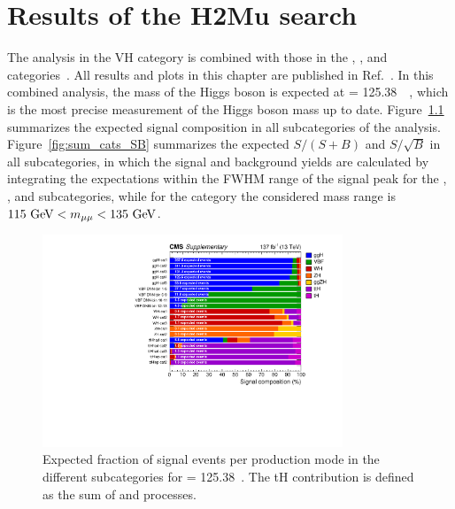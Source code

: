 \chapter{Results of the H2Mu search} \label{chp:hmm_results}

The analysis in the VH category is combined with those in the \ggH, \qqH, and \ttH categories~\cite{Sirunyan_2021}.
All results and plots in this chapter are published in Ref.~\cite{Sirunyan_2021}.
In this combined analysis, the mass of the Higgs boson is expected at \mh = 125.38~\GeV~\cite{2020135425},
which is the most precise measurement of the Higgs boson mass up to date.
Figure~\ref{fig:sum_cats_comp} summarizes the expected signal composition in all subcategories of the \hmm analysis.
Figure~\ref{fig:sum_cats_SB} summarizes the expected $S/(S+B)$ and $S/\sqrt{B}$ in all subcategories,
in which the signal and background yields are calculated by integrating the expectations within the FWHM range of the signal peak for the \ggH, \VH, and \ttH subcategories,
while for the \qqH category the considered mass range is $115~\mbox{GeV} < m_{\mu\mu} < 135~\mbox{GeV}$.

\begin{figure}[!htb]
    \centering
    \captionsetup{justification=justified}
    \includegraphics[width=0.80\textwidth]{pics/results/sig_composition.pdf}
    \caption{Expected fraction of signal events per production mode in the different subcategories for \mh = 125.38~\GeV.
             The tH contribution is defined as the sum of \tHq and \tHW processes.}
    \label{fig:sum_cats_comp}
\end{figure}

